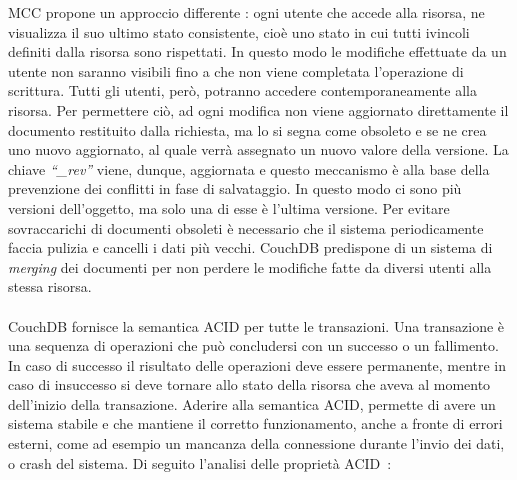 \ac{MCC} propone un approccio differente : ogni utente che accede alla risorsa,
ne visualizza il suo ultimo stato consistente, cioè uno stato in cui tutti ivincoli
definiti dalla risorsa sono rispettati. In questo modo le modifiche effettuate
da un utente non saranno visibili fino a che non viene completata l'operazione
di scrittura. Tutti gli utenti, però, potranno accedere contemporaneamente alla
risorsa. Per permettere ciò, ad ogni modifica non viene aggiornato direttamente
il documento restituito dalla richiesta, ma lo si segna come obsoleto e se ne
crea uno nuovo aggiornato, al quale verrà assegnato un nuovo valore della
versione. La chiave \emph{``\_rev''} viene, dunque, aggiornata e questo
meccanismo è alla base della prevenzione dei conflitti in fase di salvataggio.
In questo modo ci sono più versioni dell'oggetto, ma solo una di esse è l'ultima
versione. Per evitare sovraccarichi di documenti obsoleti è necessario che il
sistema periodicamente faccia pulizia e cancelli i dati più vecchi. CouchDB
predispone di un sistema di \emph{merging} dei documenti per non perdere le
modifiche fatte da diversi utenti alla stessa risorsa.
\\\\
\ac{CouchDB} fornisce la semantica \ac{ACID} per tutte le transazioni. Una transazione è una sequenza
di operazioni che può concludersi con un successo o un fallimento. In caso di
successo il risultato delle operazioni deve essere permanente, mentre in caso
di insuccesso si deve tornare allo stato della risorsa che aveva al
momento dell'inizio della transazione. Aderire alla semantica \ac{ACID},
permette di avere un sistema stabile e che mantiene il corretto funzionamento,
anche a fronte di errori esterni, come ad esempio un mancanza della connessione
durante l'invio dei dati, o crash del sistema.
Di seguito l'analisi delle proprietà \acf{ACID}~:

